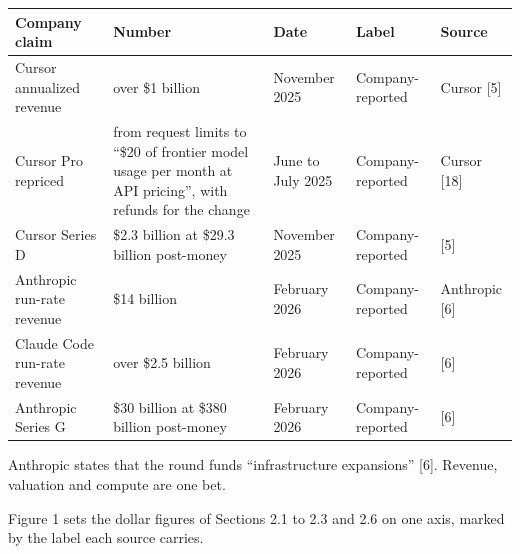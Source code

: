 \documentclass[
  10pt,
]{article}
\newcounter{none} %
\begin{document}
{\def\LTcaptype{none} %
\begin{longtable}[]{@{}
  >{\raggedright\arraybackslash}p{}
  >{\raggedright\arraybackslash}p{}
  >{\raggedright\arraybackslash}p{}
  >{\raggedright\arraybackslash}p{}
  >{\raggedright\arraybackslash}p{}@{}}
\toprule\noalign{}
\begin{minipage}[b]{\linewidth}\raggedright
Company claim
\end{minipage} & \begin{minipage}[b]{\linewidth}\raggedright
Number
\end{minipage} & \begin{minipage}[b]{\linewidth}\raggedright
Date
\end{minipage} & \begin{minipage}[b]{\linewidth}\raggedright
Label
\end{minipage} & \begin{minipage}[b]{\linewidth}\raggedright
Source
\end{minipage} \\
\midrule\noalign{}
\endhead
\bottomrule\noalign{}
\endlastfoot
Cursor annualized revenue & over \$1 billion & 13 November 2025 &
Company-reported & Cursor {[}5{]} \\
Cursor Pro repriced & from request limits to ``\$20 of frontier model
usage per month at API pricing'', with refunds for the change & June to
July 2025 & Company-reported & Cursor {[}18{]} \\
Cursor Series D & \$2.3 billion at \$29.3 billion post-money & 13
November 2025 & Company-reported & {[}5{]} \\
Anthropic run-rate revenue & \$14 billion & 12 February 2026 &
Company-reported & Anthropic {[}6{]} \\
Claude Code run-rate revenue & over \$2.5 billion & 12 February 2026 &
Company-reported & {[}6{]} \\
Anthropic Series G & \$30 billion at \$380 billion post-money & 12
February 2026 & Company-reported & {[}6{]} \\
\end{longtable}
}

Anthropic states that the round funds ``infrastructure expansions''
{[}6{]}. Revenue, valuation and compute are one bet.

Figure 1 sets the dollar figures of Sections 2.1 to 2.3 and 2.6 on one
axis, marked by the label each source carries.
\end{document}
